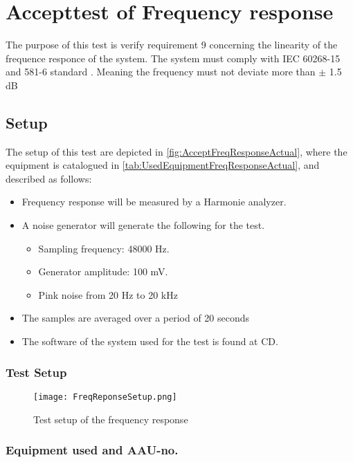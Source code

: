 \chapter{Accepttest of Frequency response}\label{app:journal_Frequency_Response}
The purpose of this test is verify requirement 9 concerning the linearity of the frequence responce of the system. The system must comply with IEC 60268-15 and 581-6 standard \citep{IEC60268}. Meaning the frequency must not deviate more than $\pm$ 1.5 dB

\section{Setup}
The setup of this test are depicted in \autoref{fig:AcceptFreqResponseActual}, where the equipment is catalogued in \autoref{tab:UsedEquipmentFreqResponseActual}, and described as follows:

\begin{itemize}
\item Frequency response will be measured by a Harmonie analyzer.
\item A noise generator will generate the following for the test. 
\begin{itemize}
\item Sampling frequency: 48000 Hz.
\item Generator amplitude: 100 mV.
\item Pink noise from 20 Hz to 20 kHz
\end{itemize}
\item The samples are averaged over a period of 20 seconds
\item The software of the system used for the test is found at CD. 
\end{itemize}


\subsection*{Test Setup}
\begin{figure}[H]
\centering
\texttt{[image: FreqReponseSetup.png]}
\caption{Test setup of the frequency response}
\label{fig:AcceptFreqResponseActual}
\end{figure}

\subsection*{Equipment used and AAU-no.}

